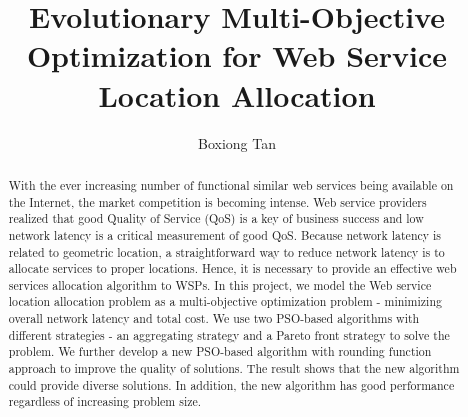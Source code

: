 \documentclass[11pt
              , a4paper
              , twoside
              , openright
              ]{report}
\title{Evolutionary Multi-Objective Optimization for Web Service Location Allocation}
\author{Boxiong Tan}
\date{}
\begin{document}
\frontmatter



\begin{abstract}
With the ever increasing number of functional similar web services being available on the Internet, 
the market competition is becoming intense. 
Web service providers realized that good Quality of Service (QoS) is a key of business success
and low network latency is a critical measurement of good QoS.
Because network latency is related to geometric location,
a straightforward way to reduce network latency is to allocate services to proper locations. 
Hence, it is necessary to provide an effective web services allocation algorithm to WSPs. 
In this project, we model the Web service location allocation 
problem as a multi-objective optimization problem - minimizing overall network latency and total cost. 
We use two PSO-based algorithms with different strategies - an aggregating strategy and a Pareto front 
strategy to solve the problem. We further develop a new PSO-based algorithm with rounding function approach to improve the quality of solutions. 
The result shows that the new algorithm could provide diverse solutions. In addition, the new algorithm has good 
performance regardless of increasing problem size.

\end{abstract}


\maketitle



\tableofcontents



\mainmatter




% 
 



\backmatter



%


\end{document}

